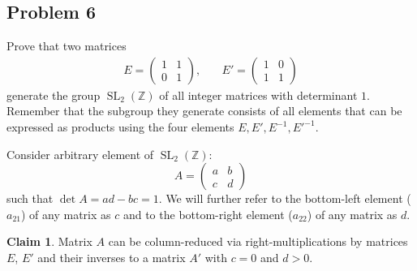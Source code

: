 \documentclass{article}
\theoremstyle{definition}
\newtheorem*{claim}{Claim}
\newcommand{\Z}{\mathbb{Z}}
\newcommand{\SL}{\operatorname{SL}}
\begin{document}
\subsection*{Problem 6}

\begin{tcolorbox}
Prove that two matrices
\begin{align*}
E =
    \begin{pmatrix}
        1 & 1 \\
        0 & 1
    \end{pmatrix},
\quad &
E' = 
    \begin{pmatrix}
        1 & 0 \\
        1 & 1
    \end{pmatrix}
\end{align*}
generate the group $\SL_2(\Z)$ of all integer matrices with determinant $1$. 
Remember that the subgroup they generate consists of all elements that can be expressed as products using the four elements $E, E', E^{-1}, E'^{-1}$.
\end{tcolorbox}

Consider arbitrary element of $\SL_2(\Z)$:
\[ A =
    \begin{pmatrix}
        a & b \\
        c & d
    \end{pmatrix}
\]
such that $\det A = ad - bc = 1$.
We will further refer to the bottom-left element ($a_{21}$) of any matrix as $c$ and to the bottom-right element ($a_{22}$) of any matrix as $d$.

\begin{claim}
Matrix $A$ can be column-reduced via right-multiplications by matrices $E$, $E'$ and their inverses to a matrix $A'$ with $c = 0$ and $d > 0$.
\end{claim}
\end{document}
